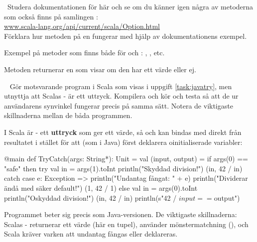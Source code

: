 \QUESTEND







\QUESTBEGIN

\Task  \what~Studera dokumentationen för  här och se om du känner igen några av metoderna som också finns på samlingen :\\ \href{http://www.scala-lang.org/api/current/scala/Option.html}{www.scala-lang.org/api/current/scala/Option.html}
\\Förklara hur metoden  på en  fungerar med hjälp av dokumentationens exempel.



\SOLUTION


\TaskSolved \what 

Exempel på metoder som finns både för  och :
, ,  etc.

Metoden  returnerar en  som visar om den har ett värde eller ej.


\QUESTEND







\QUESTBEGIN

\Task  \what~ Gör motsvarande program i Scala som visas i uppgift \ref{task:javatry}, men utnyttja att Scalas - är ett uttryck. Kompilera och kör och testa så att de ur användarens synvinkel fungerar precis på samma sätt. Notera de viktigaste skillnaderna mellan de båda programmen.


\SOLUTION


\TaskSolved \what
I Scala är - ett \textbf{uttryck} som ger ett värde, så  och  kan bindas med  direkt från resultatet i stället för att (som i Java) först deklarera oinitialiserade variabler:
\begin{Code}
@main def TryCatch(args: String*): Unit =
  val (input, output) =
    if args(0) == "safe" then
      try
        val in = args(1).toInt
        println("Skyddad division!")
        (in, 42 / in)
      catch
        case e: Exception =>
          println("Undantag fångat: " + e)
          println("Dividerar ändå med säker default!")
          (1, 42 / 1)
    else
      val in = args(0).toInt
      println("Oskyddad division!")
      (in, 42 / in)
  println(s"42 / $input == $output")
\end{Code}
Programmet beter sig precis som Java-versionen. De viktigaste skillnaderna: Scalas - returnerar ett värde (här en tupel),  använder mönstermatchning (), och Scala kräver varken att undantag fångas eller deklareras.


